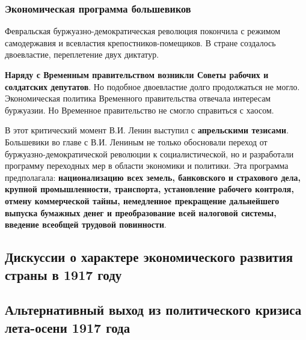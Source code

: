 \documentclass{article}
\begin{document}
\subsubsection{Экономическая программа большевиков}

Февральская буржуазно-демократическая революция покончила с режимом самодержавия и всевластия крепостников-помещиков. В стране создалось двоевластие, переплетение двух диктатур.

\hfill

\textbf{Наряду с Временным правительством возникли Советы рабочих и солдатских депутатов}. Но подобное двоевластие долго продолжаться не могло. Экономическая политика Временного правительства отвечала интересам буржуазии. Но Временное правительство не смогло справиться с хаосом.

\hfill

В этот критический момент В.И. Ленин выступил с \textbf{апрельскими тезисами}. Большевики во главе с В.И. Лениным не только обосновали переход от буржуазно-демократической революции к социалистической, но и разработали программу переходных мер в области экономики и политики. Эта программа предполагала: \textbf{национализацию всех земель, банковского и страхового дела, крупной промышленности, транспорта, установление рабочего контроля, отмену коммерческой тайны, немедленное прекращение дальнейшего выпуска бумажных денег и преобразование всей налоговой системы, введение всеобщей трудовой повинности}.

\pagebreak
\subsection{Дискуссии о характере экономического развития страны в 1917 году}

\pagebreak
\subsection{Альтернативный выход из политического кризиса лета-осени 1917 года}
\end{document}
